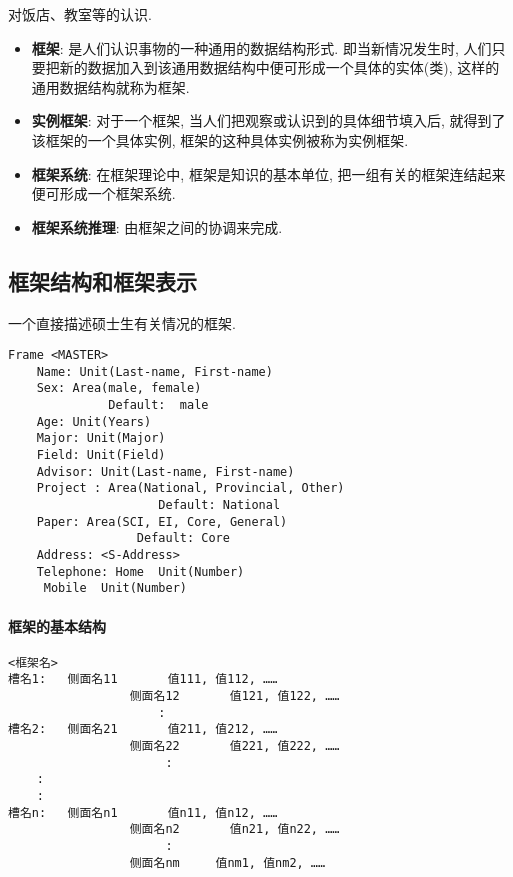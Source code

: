 \begin{example}
    对饭店、教室等的认识.
\begin{itemize}
    \item \textbf{框架}: 是人们认识事物的一种通用的数据结构形式. 即当新情况发生时, 人们只要把新的数据加入到该通用数据结构中便可形成一个具体的实体(类), 这样的通用数据结构就称为框架.
    \item \textbf{实例框架}: 对于一个框架, 当人们把观察或认识到的具体细节填入后, 就得到了该框架的一个具体实例, 框架的这种具体实例被称为实例框架.
    \item \textbf{框架系统}: 在框架理论中, 框架是知识的基本单位, 把一组有关的框架连结起来便可形成一个框架系统.
    \item \textbf{框架系统推理}: 由框架之间的协调来完成.
\end{itemize}
\end{example}
\subsection{框架结构和框架表示}
\begin{example}
一个直接描述硕士生有关情况的框架.
\end{example}
\begin{Verbatim}
Frame <MASTER>
    Name: Unit(Last-name, First-name)
    Sex: Area(male, female)
              Default:  male
    Age: Unit(Years)
    Major: Unit(Major)
    Field: Unit(Field)
    Advisor: Unit(Last-name, First-name)
    Project : Area(National, Provincial, Other)
                     Default: National
    Paper: Area(SCI, EI, Core, General)
                  Default: Core
    Address: <S-Address>
    Telephone: Home  Unit(Number)
     Mobile  Unit(Number)
\end{Verbatim}

\paragraph{框架的基本结构}
\begin{Verbatim}
<框架名>
槽名1:   侧面名11       值111, 值112, ……
                 侧面名12       值121, 值122, ……
                     :
槽名2:   侧面名21       值211, 值212, ……
                 侧面名22       值221, 值222, ……
                      :
    :
    :
槽名n:   侧面名n1       值n11, 值n12, ……
                 侧面名n2       值n21, 值n22, ……
                      :
                 侧面名nm     值nm1, 值nm2, ……
\end{Verbatim}


